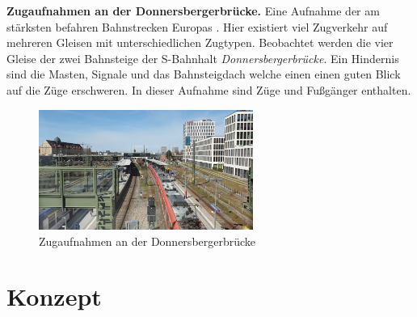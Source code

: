 \documentclass[conference]{IEEEtran}
\begin{document}
	\textbf{Zugaufnahmen an der Donnersbergerbrücke.} Eine Aufnahme der am stärksten befahren Bahnstrecken Europas \cite{z1}. Hier existiert viel Zugverkehr auf mehreren Gleisen mit unterschiedlichen Zugtypen. Beobachtet werden die vier Gleise der zwei Bahnsteige der S-Bahnhalt \textit{Donnersbergerbrücke}. Ein Hindernis sind die Masten, Signale und das Bahnsteigdach welche einen einen guten Blick auf die Züge erschweren. In dieser Aufnahme sind Züge und Fußgänger enthalten.
	\begin{figure}[!h]
		\begin{center}
			\includegraphics[width=7cm]{Media/DonnersbergerRaw.png}
			\caption{Zugaufnahmen an der Donnersbergerbrücke}
			\label{BrudermuhlRaw}
		\end{center}
	\end{figure}


	\section{Konzept}
	
\end{document}
